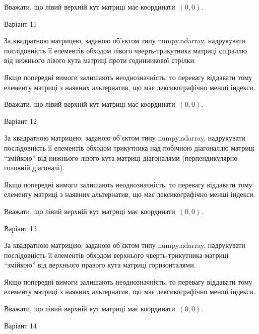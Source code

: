 \documentclass[11pt]{article}
\begin{document}
Вважати, що лівий верхній кут матриці має координати~$(0,0)$.



\newpage
{\Large \center  Варіант  11\par \bigskip\bigskip}

За квадратною матрицею, заданою об'єктом типу numpy.ndarray, надрукувати послідовність її елементів обходом лівого чверть-трикутника матриці спіраллю від нижнього лівого кута матриці проти годинникової стрілки.

\vspace{2mm}
Якщо попередні вимоги залишають неоднозначність, то перевагу віддавати тому елементу матриці з наявних альтернатив, що має лексикографічно менші індекси.

Вважати, що лівий верхній кут матриці має координати~$(0,0)$.



{\Large \center  Варіант  12\par \bigskip\bigskip}

За квадратною матрицею, заданою об'єктом типу numpy.ndarray, надрукувати послідовність її елементів обходом трикутника над побічною діагоналлю матриці ``змійкою'' від нижнього лівого кута матриці діагоналями (перпендикулярно головній діагоналі).

\vspace{2mm}
Якщо попередні вимоги залишають неоднозначність, то перевагу віддавати тому елементу матриці з наявних альтернатив, що має лексикографічно менші індекси.

Вважати, що лівий верхній кут матриці має координати~$(0,0)$.



{\Large \center  Варіант  13\par \bigskip\bigskip}

За квадратною матрицею, заданою об'єктом типу numpy.ndarray, надрукувати послідовність її елементів обходом верхнього чверть-трикутника матриці ``змійкою'' від верхнього правого кута матриці горизонталями.

\vspace{2mm}
Якщо попередні вимоги залишають неоднозначність, то перевагу віддавати тому елементу матриці з наявних альтернатив, що має лексикографічно менші індекси.

Вважати, що лівий верхній кут матриці має координати~$(0,0)$.



{\Large \center  Варіант  14\par \bigskip\bigskip}
\end{document}
